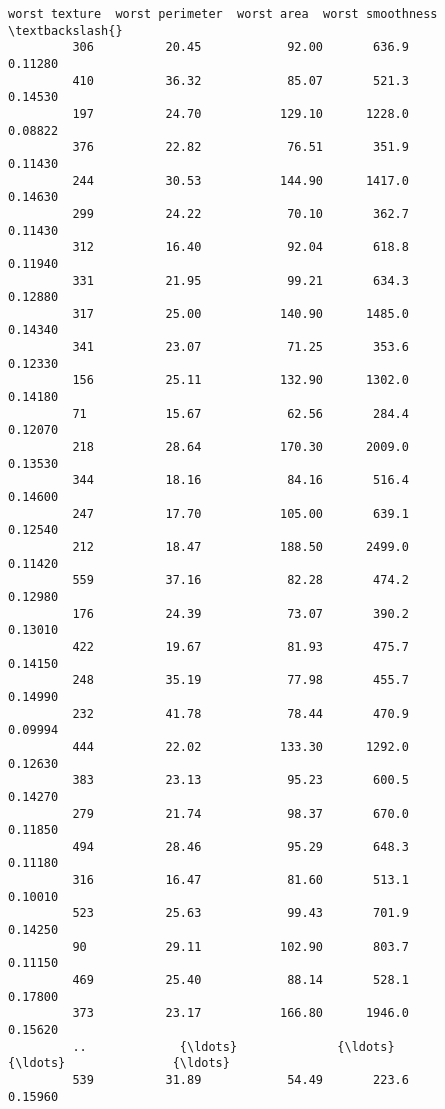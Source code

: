 \documentclass[11pt]{article}
\begin{document}
\begin{Verbatim}[commandchars=\\\{\}]
              worst texture  worst perimeter  worst area  worst smoothness  \textbackslash{}
         306          20.45            92.00       636.9           0.11280   
         410          36.32            85.07       521.3           0.14530   
         197          24.70           129.10      1228.0           0.08822   
         376          22.82            76.51       351.9           0.11430   
         244          30.53           144.90      1417.0           0.14630   
         299          24.22            70.10       362.7           0.11430   
         312          16.40            92.04       618.8           0.11940   
         331          21.95            99.21       634.3           0.12880   
         317          25.00           140.90      1485.0           0.14340   
         341          23.07            71.25       353.6           0.12330   
         156          25.11           132.90      1302.0           0.14180   
         71           15.67            62.56       284.4           0.12070   
         218          28.64           170.30      2009.0           0.13530   
         344          18.16            84.16       516.4           0.14600   
         247          17.70           105.00       639.1           0.12540   
         212          18.47           188.50      2499.0           0.11420   
         559          37.16            82.28       474.2           0.12980   
         176          24.39            73.07       390.2           0.13010   
         422          19.67            81.93       475.7           0.14150   
         248          35.19            77.98       455.7           0.14990   
         232          41.78            78.44       470.9           0.09994   
         444          22.02           133.30      1292.0           0.12630   
         383          23.13            95.23       600.5           0.14270   
         279          21.74            98.37       670.0           0.11850   
         494          28.46            95.29       648.3           0.11180   
         316          16.47            81.60       513.1           0.10010   
         523          25.63            99.43       701.9           0.14250   
         90           29.11           102.90       803.7           0.11150   
         469          25.40            88.14       528.1           0.17800   
         373          23.17           166.80      1946.0           0.15620   
         ..             {\ldots}              {\ldots}         {\ldots}               {\ldots}   
         539          31.89            54.49       223.6           0.15960   

\end{Verbatim}
\end{document}
